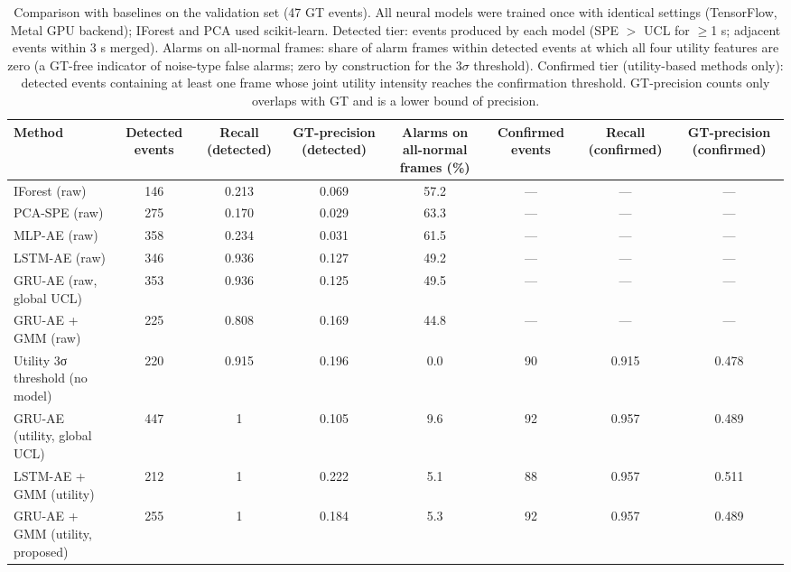 \begin{table}
\caption{Comparison with baselines on the validation set (47 GT events). All neural models were trained once with identical settings (TensorFlow, Metal GPU backend); IForest and PCA used scikit-learn. Detected tier: events produced by each model (SPE $>$ UCL for $\geq$1 s; adjacent events within 3 s merged). Alarms on all-normal frames: share of alarm frames within detected events at which all four utility features are zero (a GT-free indicator of noise-type false alarms; zero by construction for the 3$\sigma$ threshold). Confirmed tier (utility-based methods only): detected events containing at least one frame whose joint utility intensity reaches the confirmation threshold. GT-precision counts only overlaps with GT and is a lower bound of precision.}
\label{tab:baselines}
\begin{tabular}{lccccccc}
\toprule
Method & Detected events & Recall (detected) & GT-precision (detected) & Alarms on all-normal frames (\%) & Confirmed events & Recall (confirmed) & GT-precision (confirmed) \\
\midrule
IForest (raw) & 146 & 0.213 & 0.069 & 57.2 & — & — & — \\
PCA-SPE (raw) & 275 & 0.170 & 0.029 & 63.3 & — & — & — \\
MLP-AE (raw) & 358 & 0.234 & 0.031 & 61.5 & — & — & — \\
LSTM-AE (raw) & 346 & 0.936 & 0.127 & 49.2 & — & — & — \\
GRU-AE (raw, global UCL) & 353 & 0.936 & 0.125 & 49.5 & — & — & — \\
GRU-AE + GMM (raw) & 225 & 0.808 & 0.169 & 44.8 & — & — & — \\
Utility 3σ threshold (no model) & 220 & 0.915 & 0.196 & 0.0 & 90 & 0.915 & 0.478 \\
GRU-AE (utility, global UCL) & 447 & 1 & 0.105 & 9.6 & 92 & 0.957 & 0.489 \\
LSTM-AE + GMM (utility) & 212 & 1 & 0.222 & 5.1 & 88 & 0.957 & 0.511 \\
GRU-AE + GMM (utility, proposed) & 255 & 1 & 0.184 & 5.3 & 92 & 0.957 & 0.489 \\
\bottomrule
\end{tabular}
\end{table}
